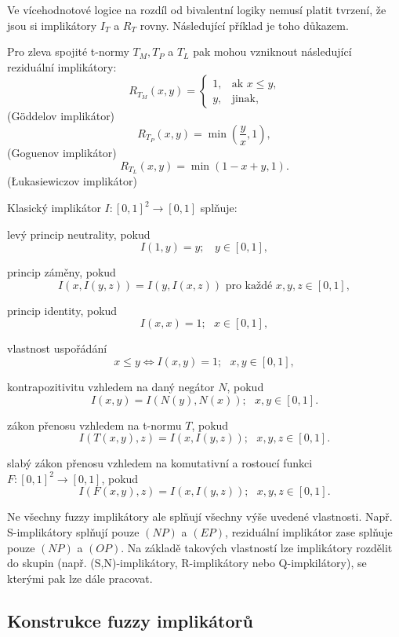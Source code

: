 Ve vícehodnotové logice na rozdíl od bivalentní logiky nemusí platit tvrzení, že jsou si implikátory $I_T$ a $R_T$ rovny. Následující příklad je toho d\r ukazem.
\begin{example} Pro zleva spojité t-normy $T_M, T_P$ a $T_L$ pak mohou vzniknout následující reziduální implikátory:
    \cite{hlinena}\\
     $$ R_{T_M}(x,y)=\begin{cases} 1, &\mbox {ak $x\leq y$,} \\y, &\mbox{jinak,} \end{cases} $$
    (Göddelov implik\' ator)
     $$ R_{T_P}(x,y)=\min \left (\frac yx,1 \right ),$$
    (Goguenov implikátor)
     $$ R_{T_L}(x,y)=\min(1-x+y,1).$$
    (\L{}ukasiewiczov implikátor)\\
\end{example}
\begin{definition}
\cite{hlinena}
Klasický implik\'ator $I:[0,1]^2 \rightarrow [0,1]$ spl\v nuje:
\begin{enumerate}
\item[(NP)] levý princip neutrality, pokud
$$I(1,y)=y; ~~~~y \in [0,1],$$
\item[(EP)] princip z\'aměny, pokud
$$I(x,I(y,z))=I(y,I(x,z)) \mbox{  pro ka\v zd\'e   } x,y,z \in [0,1],$$
\item[(IP)] princip identity, pokud
$$I(x,x) = 1; ~~~ x \in [0,1], $$
\item[(OP)] vlastnost uspořádání
$$x \leq y \iff I(x,y) =1; ~~~ x,y \in [0,1],$$
\item[(CP)] kontrapozitivitu vzhledem na dan\'y neg\'ator $N$, pokud
$$ I(x,y)=I(N(y),N(x)); ~~~ x,y \in [0,1].$$
 {\item[(LI)] z\'akon přenosu  vzhledem na  t-normu $T$, pokud
$$I(T(x, y), z) = I(x, I(y, z)); ~~~ x,y,z \in  [0, 1].$$
\item[(WLI)]  slab\'y z\'akon přenosu vzhledem na komutativní a
rostoucí funkci $F:
[0,1]^2 \to [0, 1]$, pokud
$$I(F(x, y), z) = I(x, I(y, z)); ~~~  x,y,z \in  [0, 1].$$}
\end{enumerate}
\end{definition}
Ne všechny fuzzy implikátory ale spl\v nují všechny výše uvedené vlastnosti. Např. S-implikátory spl\v nují pouze $(NP)$ a $(EP)$, reziduální implikátor zase spl\v nuje pouze $(NP)$ a $(OP).$ Na základě takových vlastností lze implikátory rozdělit do skupin (např. (S,N)-implikátory, R-implikátory nebo Q-impkilátory), se kterými pak lze dále pracovat.
\subsection{Konstrukce fuzzy implikátor\r u}

